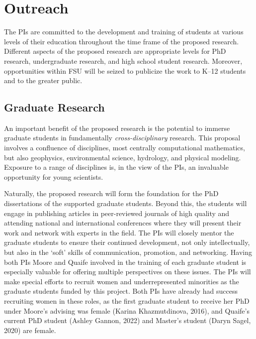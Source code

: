 \documentclass[11pt]{article}
\begin{document}
\section{Outreach}
The PIs are committed to the development and training of students at various levels of their education throughout the time frame of the proposed research. Different aspects of the proposed research are appropriate levels for PhD research, undergraduate research, and high school student research. Moreover, opportunities within FSU will be seized to publicize the work to K--12 students and to the greater public.

\subsection{Graduate Research}
An important benefit of the proposed research is the potential to immerse graduate students in fundamentally {\em cross-disciplinary} research. This proposal involves a confluence of disciplines, most centrally computational mathematics, but also geophysics, environmental science, hydrology, and physical modeling. Exposure to a range of disciplines is, in the view of the PIs, an invaluable opportunity for young scientists.  

Naturally, the proposed research will form the foundation for the PhD dissertations of the supported graduate students. Beyond this, the students will engage in publishing articles in peer-reviewed journals of high quality and attending national and international conferences where they will present their work and network with experts in the field. The PIs will closely mentor the graduate students to ensure their continued development, not only intellectually, but also in the `soft' skills of communication, promotion, and networking. Having both PIs Moore and Quaife involved in the training of each graduate student is especially valuable for offering multiple perspectives on these issues. The PIs will make special efforts to recruit women and underrepresented minorities as the graduate students funded by this project. Both PIs have already had success recruiting women in these roles, as the first graduate student to receive her PhD under Moore's advising was female (Karina Khazmutdinova, 2016), and Quaife's current PhD student (Ashley Gannon, 2022) and Master's student (Daryn Sagel, 2020) are female.
\end{document}
